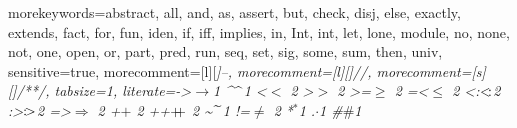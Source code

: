 \usepackage{listings}
\usepackage[usenames,dvipsnames]{color}

{morekeywords={abstract, all, and, as, assert, but, check, disj, else,
  exactly, extends, fact, for, fun, iden, if, iff, implies, in, Int,
  int, let, lone, module, no, none, not, one, open, or, part, pred,
  run, seq, set, sig, some, sum, then, univ},
sensitive=true,
morecomment=[l][\small\itshape]{--},
morecomment=[l][\small\itshape]{//},
morecomment=[s][\small\itshape]{/*}{*/},
tabsize=1,
literate={->}{{$\to$}}1 {^}{{$\mspace{-3mu}\widehat{\quad}\mspace{-3mu}$}}1
 {<}{$<$ }2 {>}{$>$ }2 {>=}{$\geq$ }2 {=<}{$\leq$ }2
 {<:}{{$<\mspace{-3mu}:$}}2 {:>}{{$:\mspace{-3mu}>$}}2
 {=>}{{$\Rightarrow$ }}2 {+}{$+$ }2 {++}{{$+\mspace{-8mu}+$ }}2
 {\~}{{$\mspace{-3mu}\widetilde{\quad}\mspace{-3mu}$}}1
 {!=}{$\neq$ }2 {*}{${}^{\ast}$}1 {.}{$\cdot$}1
 {\#}{$\#$}1
}


